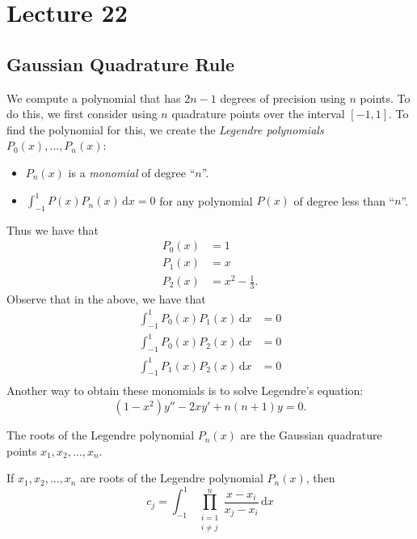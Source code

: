 \documentclass[class=article, crop=false]{standalone}
\begin{document}
  \section{Lecture 22}
  \subsection{Gaussian Quadrature Rule}
  We compute a polynomial that has $2n - 1$ degrees of precision using $n$ points. To do this, we first consider using $n$ quadrature points over the interval $[-1, 1]$. To find the polynomial for this, we create the \emph{Legendre polynomials} $P_0(x),\dotsc,P_n(x)$:
  \begin{itemize}
    \item $P_n(x)$ is a \emph{monomial} of degree ``$n$''.
    \item $\int_{-1}^{1}P(x)P_n(x) \,\mathrm dx = 0$ for any polynomial $P(x)$ of degree less than ``$n$''.
  \end{itemize}
  Thus we have that
  \begin{align*}
    P_0(x) &= 1 \\
    P_1(x) &= x \\
    P_2(x) &= x^2 - \frac{1}{3}.
  \end{align*}
  Observe that in the above, we have that
  \begin{align*}
    \int_{-1}^{1}P_0(x)P_1(x) \,\mathrm dx &= 0 \\
    \int_{-1}^{1}P_0(x)P_2(x) \,\mathrm dx &= 0 \\
    \int_{-1}^{1}P_1(x)P_2(x) \,\mathrm dx &= 0 \\
  \end{align*}
  Another way to obtain these monomials is to solve Legendre's equation:
  \[
    (1 - x^2)y'' - 2xy' + n(n + 1)y = 0.
  \]
  \begin{note}{}
    The roots of the Legendre polynomial $P_n(x)$ are the Gaussian quadrature points $x_1,x_2,\dotsc,x_n$.
  \end{note}
  If $x_1,x_2,\dotsc,x_n$ are roots of the Legendre polynomial $P_n(x)$, then
  \[
    c_j = \int_{-1}^{1} \prod_{\substack{i = 1\\i\neq j}}^{n} \frac{x - x_i}{x_j - x_i}\,\mathrm dx
  \]
\end{document}
